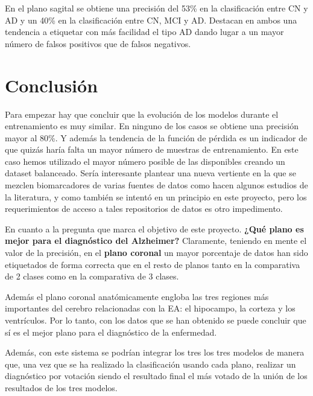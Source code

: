 En el plano sagital se obtiene una precisión del 53\% en la clasificación entre CN y AD y un 40\% en la clasificación
entre CN, MCI y AD. Destacan en ambos una tendencia a etiquetar con más facilidad el tipo AD dando lugar a un mayor
número de falsos positivos que de falsos negativos.

\section{Conclusión}\label{sec:conclusion}

Para empezar hay que concluir que la evolución de los modelos durante el entrenamiento es muy similar.
En ninguno de los casos se obtiene una precisión mayor al 80\%.
Y además la tendencia de la función de pérdida es un indicador de que quizás haría falta un mayor número de muestras de
entrenamiento.
En este caso hemos utilizado el mayor número posible de las disponibles creando un dataset balanceado.
Sería interesante plantear una nueva vertiente en la que se mezclen biomarcadores de varias fuentes de datos como hacen
algunos estudios de la literatura, y como también se intentó en un principio en este proyecto, pero los requerimientos
de acceso a tales repositorios de datos es otro impedimento.

En cuanto a la pregunta que marca el objetivo de este proyecto. \textbf{¿Qué plano es mejor para el diagnóstico del
Alzheimer?} Claramente, teniendo en mente el valor de la precisión, en el \textbf{plano coronal} un mayor porcentaje
de datos han sido etiquetados de forma correcta que en el resto de planos tanto en la comparativa de 2 clases como
en la comparativa de 3 clases.

Además el plano coronal anatómicamente engloba las tres regiones más importantes del cerebro relacionadas con la EA:
el hipocampo, la corteza y los ventrículos.
Por lo tanto, con los datos que se han obtenido se puede concluir que sí es el mejor plano para el diagnóstico de la
enfermedad.

Además, con este sistema se podrían integrar los tres los tres modelos de manera que, una vez que se ha realizado
la clasificación usando cada plano, realizar un diagnóstico por votación siendo el resultado final el más votado de la
unión de los resultados de los tres modelos.
